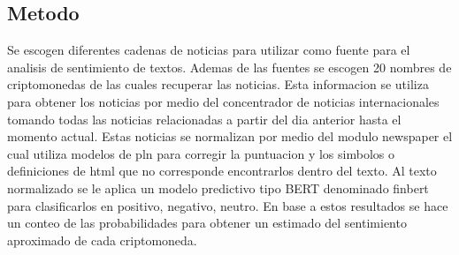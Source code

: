 \documentclass[12pt,man]{apa7}
\begin{document}
\subsection{Metodo}\label{subsec:metodo}
Se escogen diferentes cadenas de noticias para utilizar como fuente
para el analisis de sentimiento de textos.
Ademas de las fuentes se escogen 20 nombres de criptomonedas de las cuales
recuperar las noticias.
Esta informacion se utiliza para obtener los noticias por medio
del concentrador de noticias internacionales tomando todas las noticias
relacionadas a partir del dia anterior hasta el momento actual.
Estas noticias se normalizan por medio del modulo newspaper el cual utiliza
modelos de pln para corregir la puntuacion y los simbolos o definiciones de html
que no corresponde encontrarlos dentro del texto.
Al texto normalizado se le aplica un modelo predictivo tipo BERT denominado finbert
para clasificarlos en positivo, negativo, neutro.
En base a estos resultados se hace un conteo de las probabilidades para
obtener un estimado del sentimiento aproximado de cada criptomoneda.
\end{document}

